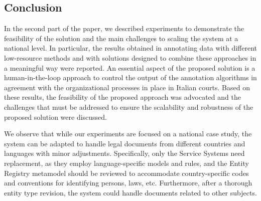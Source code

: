 \subsection{Conclusion}
In the second part of the paper, we described  experiments to demonstrate the feasibility of the solution and the main challenges to scaling the system at a national level. In particular, the results obtained in annotating data with different low-resource methods and with solutions designed to combine these approaches in a meaningful way were reported. An essential aspect of the proposed solution is a human-in-the-loop approach to control the output of the annotation algorithms in agreement with the organizational processes in place in Italian courts. Based on these results, the feasibility of the proposed approach was advocated and the challenges that must be addressed to ensure the scalability and robustness of the proposed solution were discussed.


We observe that while our experiments are focused on a national case study, the system can be adapted to handle legal documents from different countries and languages with minor adjustments. Specifically, only the Service Systems need replacement, as they employ language-specific models and rules, and the Entity Registry metamodel should be reviewed to accommodate country-specific codes and conventions for identifying persons, laws, etc. Furthermore, after a thorough entity type revision, the system could handle documents related to other subjects.
